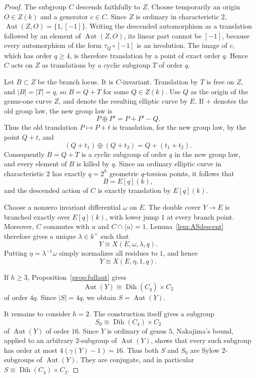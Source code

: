 \documentclass[11pt]{article}
\theoremstyle{remark}
\newcommand{\Aut}{\operatorname{Aut}}
\newcommand{\Dih}{\operatorname{Dih}}
\begin{document}
\begin{proof}
The subgroup $C$ descends faithfully to $Z$.  Choose temporarily an
origin $O\in Z(k)$ and a generator $c\in C$.  Since $Z$ is ordinary in
characteristic $2$, $\Aut(Z,O)=\{1,[-1]\}$.  Writing the descended
automorphism as a translation followed by an element of $\Aut(Z,O)$,
its linear part
cannot be $[-1]$, because every automorphism of the form
$\tau_Q\circ[-1]$ is an involution.  The image of $c$, which has order
$q\ge4$, is therefore translation by a point of exact order $q$.  Hence
$C$ acts on $Z$ as translations by a cyclic subgroup $T$ of order $q$.

Let $B\subset Z$ be the branch locus.  It is $C$-invariant.  Translation
by $T$ is free on $Z$, and $|B|=|T|=q$, so $B=Q+T$ for some
$Q\in Z(k)$.  Use $Q$ as the origin of the genus-one curve $Z$, and
denote the resulting elliptic curve by $E$.  If $+$ denotes the old group
law, the new group law is
\[
        P\oplus P'=P+P'-Q.
\]
Thus the old translation $P\mapsto P+t$ is translation, for the new
group law, by the point $Q+t$, and
\[
        (Q+t_1)\oplus(Q+t_2)=Q+(t_1+t_2).
\]
Consequently $B=Q+T$ is a cyclic subgroup of order $q$ in the new group
law, and every element of $B$ is killed by $q$.  Since an ordinary
elliptic curve in characteristic $2$ has exactly $q=2^h$ geometric
$q$-torsion points, it follows that
\[
        B=E[q](k),
\]
and the descended action of $C$ is exactly translation by $E[q](k)$.

Choose a nonzero invariant differential $\omega$ on $E$.  The double
cover $Y\to E$ is branched exactly over $E[q](k)$, with lower jump $1$ at
every branch point.  Moreover, $C$ commutes with $u$ and
$C\cap\langle u\rangle=1$.  Lemma~\ref{lem:ASdescent} therefore
gives a unique $\lambda\in k^\times$ such that
\[
        Y\cong X(E,\omega,\lambda,q).
\]
Putting $\eta=\lambda^{-1}\omega$ simply normalizes all residues to
$1$, and hence
\[
        Y\cong X(E,\eta,1,q).
\]

If $h\ge3$, Proposition~\ref{prop:fullaut} gives
\[
        \Aut(Y)\cong\Dih(C_q)\times C_2
\]
of order $4q$.  Since $|S|=4q$, we obtain $S=\Aut(Y)$.

It remains to consider $h=2$.  The construction itself gives a subgroup
\[
        S_0\cong\Dih(C_4)\times C_2
\]
of $\Aut(Y)$ of order $16$.  Since $Y$ is ordinary of genus $5$, Nakajima's bound, applied to an
arbitrary $2$-subgroup of $\Aut(Y)$, shows that every such subgroup has
order at most $4(\gamma(Y)-1)=16$.  Thus both $S$ and $S_0$ are Sylow $2$-subgroups of
$\Aut(Y)$.  They are conjugate, and in particular
$S\cong\Dih(C_4)\times C_2$.
\end{proof}
\end{document}
